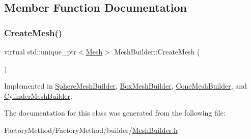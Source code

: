 \subsection{Member Function Documentation}
\mbox{\label{class_mesh_builder_a41cfd23b93c25bc016c889c2c67a2637}} 
\subsubsection{\texorpdfstring{CreateMesh()}{CreateMesh()}}
{\footnotesize\ttfamily virtual std\+::unique\+\_\+ptr$<$\mbox{\hyperlink{class_mesh}{Mesh}}$>$ Mesh\+Builder\+::\+Create\+Mesh (\begin{DoxyParamCaption}{ }\end{DoxyParamCaption})\hspace{0.3cm}{\ttfamily [pure virtual]}}



Implemented in \mbox{\hyperlink{class_sphere_mesh_builder_a17080b8851c3c5395e82536c44c0e7ec}{Sphere\+Mesh\+Builder}}, \mbox{\hyperlink{class_box_mesh_builder_a3c5a331f00e2bec89baff4711e0d2dc4}{Box\+Mesh\+Builder}}, \mbox{\hyperlink{class_cone_mesh_builder_a19a21fdb3432d350817df21315a5f93e}{Cone\+Mesh\+Builder}}, and \mbox{\hyperlink{class_cylinder_mesh_builder_a266221f05078711983a5c40f3edb58ba}{Cylinder\+Mesh\+Builder}}.



The documentation for this class was generated from the following file\+:\begin{DoxyCompactItemize}
\item 
Factory\+Method/\+Factory\+Method/builder/\mbox{\hyperlink{_mesh_builder_8h}{Mesh\+Builder.\+h}}\end{DoxyCompactItemize}
